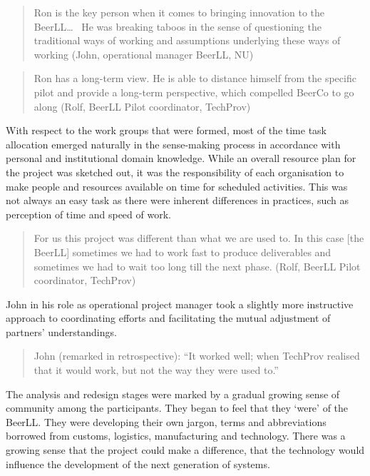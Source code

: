 \documentclass[graybox]{styles/svmult}
\begin{document}
\blockquote{Ron is the key person when it comes to bringing innovation to the BeerLL\dots~ He was breaking taboos in the sense of questioning the traditional ways of working and assumptions underlying these ways of working (John, operational manager BeerLL, NU)}

\blockquote{ Ron has a long-term view. He is able to distance himself from the specific pilot and provide a long-term perspective, which compelled BeerCo to go along (Rolf, BeerLL Pilot coordinator, TechProv)}

With respect to the work groups that were formed, most of the time task allocation emerged naturally in the sense-making process in accordance with personal and institutional domain knowledge. While an overall resource plan for the project was sketched out, it was the responsibility of each organisation to make people and resources available on time for scheduled activities. This was not always an easy task as there were inherent differences in practices, such as perception of time and speed of work. 

\blockquote{For us this project was different than what we are used to. In this case [the BeerLL] sometimes we had to work fast to produce deliverables and sometimes we had to wait too long till the next phase. (Rolf, BeerLL Pilot coordinator, TechProv)}

John in his role as operational project manager took a slightly more instructive approach to coordinating efforts and facilitating the mutual adjustment of partners' understandings.

\blockquote{
John (remarked in retrospective): \enquote{It worked well;  when TechProv realised that it would work, but not the way they were used to.}
}
The analysis and redesign stages were marked by a gradual growing sense of community among the participants. They began to feel that they `were' of the BeerLL. They were developing their own jargon, terms and abbreviations borrowed from customs, logistics, manufacturing and technology. There was a growing sense that the project could make a difference, that the technology would influence the development of the next generation of systems. 
\end{document}
